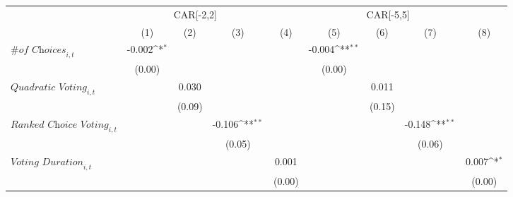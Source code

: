 {
\def\sym#1{\ifmmode^{#1}\else\(^{#1}\)\fi}
\begin{tabular}{l*{8}{c}}
\toprule
                    &\multicolumn{3}{c}{CAR[-2,2]}                                    &\multicolumn{5}{c}{CAR[-5,5]}                                                                                \\\cmidrule(lr){2-4}\cmidrule(lr){5-9}
                    &\multicolumn{1}{c}{(1)}         &\multicolumn{1}{c}{(2)}         &\multicolumn{1}{c}{(3)}         &\multicolumn{1}{c}{(4)}         &\multicolumn{1}{c}{(5)}         &\multicolumn{1}{c}{(6)}         &\multicolumn{1}{c}{(7)}         &\multicolumn{1}{c}{(8)}         \\
\midrule
$\textit{\# of Choices}_{i,t}$&      -0.002\sym{*}  &                     &                     &                     &      -0.004\sym{**} &                     &                     &                     \\
                    &      (0.00)         &                     &                     &                     &      (0.00)         &                     &                     &                     \\
$\textit{Quadratic Voting}_{i,t}$&                     &       0.030         &                     &                     &                     &       0.011         &                     &                     \\
                    &                     &      (0.09)         &                     &                     &                     &      (0.15)         &                     &                     \\
$\textit{Ranked Choice Voting}_{i,t}$&                     &                     &      -0.106\sym{**} &                     &                     &                     &      -0.148\sym{**} &                     \\
                    &                     &                     &      (0.05)         &                     &                     &                     &      (0.06)         &                     \\
$\textit{Voting Duration}_{i,t}$&                     &                     &                     &       0.001         &                     &                     &                     &       0.007\sym{*}  \\
                    &                     &                     &                     &      (0.00)         &                     &                     &                     &      (0.00)         \\

\end{tabular}}
